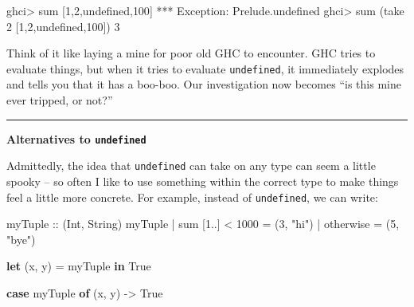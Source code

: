 \documentclass[]{article}
\newenvironment{Shaded}{}{}
\newcommand{\DataTypeTok}[1]{\textcolor[rgb]{0.56,0.13,0.00}{#1}}
\newcommand{\DecValTok}[1]{\textcolor[rgb]{0.25,0.63,0.44}{#1}}
\newcommand{\FunctionTok}[1]{\textcolor[rgb]{0.02,0.16,0.49}{#1}}
\newcommand{\KeywordTok}[1]{\textcolor[rgb]{0.00,0.44,0.13}{\textbf{#1}}}
\newcommand{\NormalTok}[1]{#1}
\newcommand{\OperatorTok}[1]{\textcolor[rgb]{0.40,0.40,0.40}{#1}}
\newcommand{\OtherTok}[1]{\textcolor[rgb]{0.00,0.44,0.13}{#1}}
\newcommand{\StringTok}[1]{\textcolor[rgb]{0.25,0.44,0.63}{#1}}
\begin{document}
\begin{Shaded}
\begin{Highlighting}[]
\NormalTok{ghci}\OperatorTok{>} \FunctionTok{sum}\NormalTok{ [}\DecValTok{1}\NormalTok{,}\DecValTok{2}\NormalTok{,}\FunctionTok{undefined}\NormalTok{,}\DecValTok{100}\NormalTok{]}
\OperatorTok{***} \DataTypeTok{Exception}\OperatorTok{:}\NormalTok{ Prelude.undefined}
\NormalTok{ghci}\OperatorTok{>} \FunctionTok{sum}\NormalTok{ (}\FunctionTok{take} \DecValTok{2}\NormalTok{ [}\DecValTok{1}\NormalTok{,}\DecValTok{2}\NormalTok{,}\FunctionTok{undefined}\NormalTok{,}\DecValTok{100}\NormalTok{])}
\DecValTok{3}
\end{Highlighting}
\end{Shaded}

Think of it like laying a mine for poor old GHC to encounter. GHC tries to
evaluate things, but when it tries to evaluate \texttt{undefined}, it
immediately explodes and tells you that it has a boo-boo. Our investigation now
becomes ``is this mine ever tripped, or not?''

\begin{center}\rule{0.5\linewidth}{\linethickness}\end{center}

\textbf{Alternatives to \texttt{undefined}}

Admittedly, the idea that \texttt{undefined} can take on any type can seem a
little spooky -- so often I like to use something within the correct type to
make things feel a little more concrete. For example, instead of
\texttt{undefined}, we can write:

\begin{Shaded}
\begin{Highlighting}[]
\OtherTok{myTuple ::}\NormalTok{ (}\DataTypeTok{Int}\NormalTok{, }\DataTypeTok{String}\NormalTok{)}
\NormalTok{myTuple}
  \OperatorTok{|} \FunctionTok{sum}\NormalTok{ [}\DecValTok{1}\OperatorTok{..}\NormalTok{] }\OperatorTok{<} \DecValTok{1000} \OtherTok{=}\NormalTok{ (}\DecValTok{3}\NormalTok{, }\StringTok{"hi"}\NormalTok{)}
  \OperatorTok{|} \FunctionTok{otherwise}        \OtherTok{=}\NormalTok{ (}\DecValTok{5}\NormalTok{, }\StringTok{"bye"}\NormalTok{)}

\KeywordTok{let}\NormalTok{ (x, y) }\OtherTok{=}\NormalTok{ myTuple}
\KeywordTok{in}  \DataTypeTok{True}

\KeywordTok{case}\NormalTok{ myTuple }\KeywordTok{of}
\NormalTok{    (x, y) }\OtherTok{{-}>} \DataTypeTok{True}
\end{Highlighting}
\end{Shaded}
\end{document}
